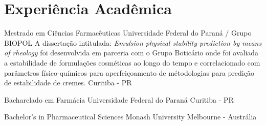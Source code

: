 \section{Experiência Acadêmica}

{Mestrado em Ciências Farmacêuticas}
{Universidade Federal do Paraná / Grupo BIOPOL}
{
A dissertação intitulada: \emph{Emulsion physical stability prediction by means of rheology}
foi desenvolvida em parceria com o Grupo Boticário onde foi avaliada a estabilidade
de formulações cosméticas ao longo do tempo e correlacionado com parâmetros 
físico-químicos para aperfeiçoamento de métodologias para predição de estabilidade de cremes.
}
{Curitiba - PR}

{Bacharelado em Farmácia}
{Universidade Federal do Paraná}
{}
{Curitiba - PR}

{Bachelor's in Pharmaceutical Sciences}
{Monash University}
{}
{Melbourne - Austrália}